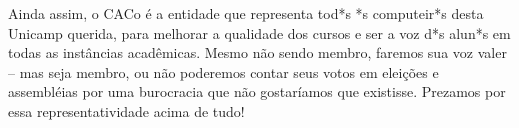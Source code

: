 Ainda assim, o CACo é a entidade que representa tod*s *s computeir*s desta
Unicamp querida, para melhorar a qualidade dos cursos e ser a voz d*s alun*s em
todas as instâncias acadêmicas. Mesmo não sendo membro, faremos sua voz valer
-- mas seja membro, ou não poderemos contar seus votos em eleições e
assembléias por uma burocracia que não gostaríamos que existisse. Prezamos por
essa representatividade acima de tudo!
